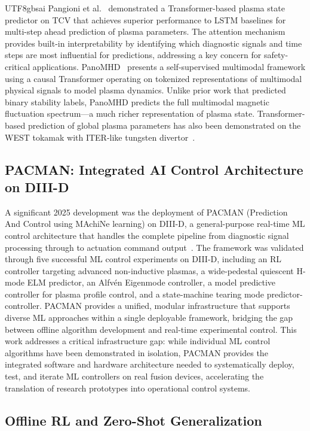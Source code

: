 \documentclass[12pt,a4paper]{article}
\begin{document}
\begin{CJK}{UTF8}{gbsai}
Pangioni et al.~\citep{Pangioni2025} demonstrated a Transformer-based plasma state predictor on TCV that achieves superior performance to LSTM baselines for multi-step ahead prediction of plasma parameters. The attention mechanism provides built-in interpretability by identifying which diagnostic signals and time steps are most influential for predictions, addressing a key concern for safety-critical applications. PanoMHD~\citep{PanoMHD2026} presents a self-supervised multimodal framework using a causal Transformer operating on tokenized representations of multimodal physical signals to model plasma dynamics. Unlike prior work that predicted binary stability labels, PanoMHD predicts the full multimodal magnetic fluctuation spectrum---a much richer representation of plasma state. Transformer-based prediction of global plasma parameters has also been demonstrated on the WEST tokamak with ITER-like tungsten divertor~\citep{Wan2026WEST}.

\subsection{PACMAN: Integrated AI Control Architecture on DIII-D}

A significant 2025 development was the deployment of PACMAN (Prediction And Control using MAchiNe learning) on DIII-D, a general-purpose real-time ML control architecture that handles the complete pipeline from diagnostic signal processing through to actuation command output~\citep{Rothstein2025PACMAN}. The framework was validated through five successful ML control experiments on DIII-D, including an RL controller targeting advanced non-inductive plasmas, a wide-pedestal quiescent H-mode ELM predictor, an Alfv\'{e}n Eigenmode controller, a model predictive controller for plasma profile control, and a state-machine tearing mode predictor-controller. PACMAN provides a unified, modular infrastructure that supports diverse ML approaches within a single deployable framework, bridging the gap between offline algorithm development and real-time experimental control. This work addresses a critical infrastructure gap: while individual ML control algorithms have been demonstrated in isolation, PACMAN provides the integrated software and hardware architecture needed to systematically deploy, test, and iterate ML controllers on real fusion devices, accelerating the translation of research prototypes into operational control systems.

\subsection{Offline RL and Zero-Shot Generalization}


\end{CJK}
\end{document}
